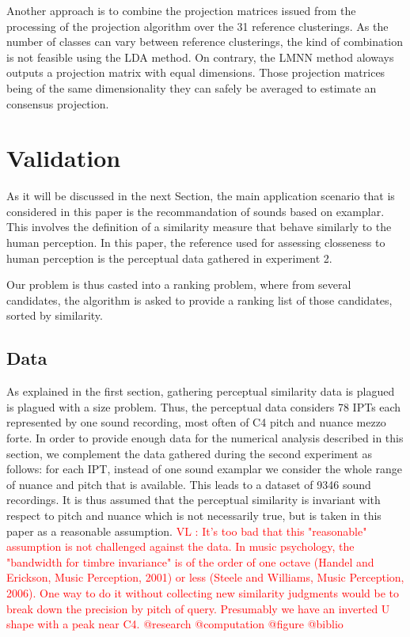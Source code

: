 \documentclass{article}
\newcommand{\ipt}{IPT\xspace}
\newcommand{\ipts}{IPTs\xspace}
\newcommand{\vl}[1]{\textcolor{red}{VL : #1}}
\begin{document}
Another approach is to combine the projection matrices issued from the processing of the projection algorithm over the 31 reference clusterings. As the number of classes can vary between reference clusterings, the kind of combination is not feasible using the LDA method. On contrary, the LMNN method aloways outputs a projection matrix with equal dimensions. Those projection matrices being of the same dimensionality they can safely be averaged to estimate an consensus projection.

\section{Validation}\label{sec:validation}

As it will be discussed in the next Section, the main application scenario that is considered in this paper is the recommandation of sounds based on examplar. This involves the definition of a similarity measure that behave similarly to the human perception. In this paper, the reference used for assessing closseness to human perception is the perceptual data gathered in experiment 2.

Our problem is thus casted into a ranking problem, where from several candidates, the algorithm is asked to provide a ranking list of those candidates, sorted by similarity.

\subsection{Data}

As explained in the first section, gathering perceptual similarity data is plagued is plagued with a size problem. Thus, the perceptual data considers 78 \ipts each represented by one sound recording, most often of C4 pitch and nuance mezzo forte. In order to provide enough data for the numerical analysis described in this section, we complement the data gathered during the second experiment as follows: for each \ipt, instead of one sound examplar we consider the whole range of nuance and pitch that is available. This leads to a dataset of 9346 sound recordings. It is thus assumed that the perceptual similarity is invariant with respect to pitch and nuance which is not necessarily true, but is taken in this paper as a reasonable assumption.
\vl{It's too bad that this "reasonable" assumption is not challenged against the data. In music psychology, the "bandwidth for timbre invariance" is of the order of one octave (Handel and Erickson, Music Perception, 2001) or less (Steele and Williams, Music Perception, 2006).
One way to do it without collecting new similarity judgments would be to break down the precision by pitch of query.
Presumably we have an inverted U shape with a peak near C4.
@research @computation @figure @biblio}
\end{document}
